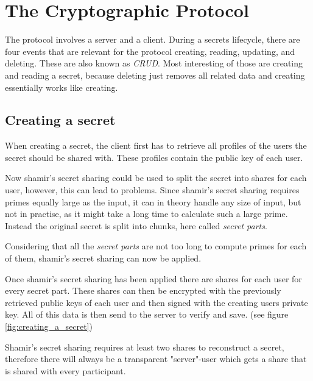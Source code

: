 \section{The Cryptographic Protocol}

The protocol involves a server and a client. During a secrets lifecycle, there
are four events that are relevant for the protocol creating, reading, updating,
and deleting. These are also known as \textit{CRUD}. Most interesting of those
are creating and reading a secret, because deleting just removes all related
data and creating essentially works like creating.

\subsection{Creating a secret}

When creating a secret, the client first has to retrieve all profiles of the
users the secret should be shared with. These profiles contain the public key
of each user.

Now shamir's secret sharing could be used to split the secret into shares for
each user, however, this can lead to problems. Since shamir's secret sharing
requires primes equally large as the input, it can in theory handle any size of
input, but not in practise, as it might take a long time to calculate such a
large prime. Instead the original secret is split into chunks, here called
\textit{secret parts}.

Considering that all the \textit{secret parts} are not too long to compute
primes for each of them, shamir's secret sharing can now be applied.

Once shamir's secret sharing has been applied there are shares for each user
for every secret part. These shares can then be encrypted with the previously
retrieved public keys of each user and then signed with the creating users
private key. All of this data is then send to the server to verify and save.
(see figure \ref{fig:creating_a_secret})

Shamir's secret sharing requires at least two shares to reconstruct a secret,
therefore there will always be a transparent "server"-user which gets a share
that is shared with every participant.


